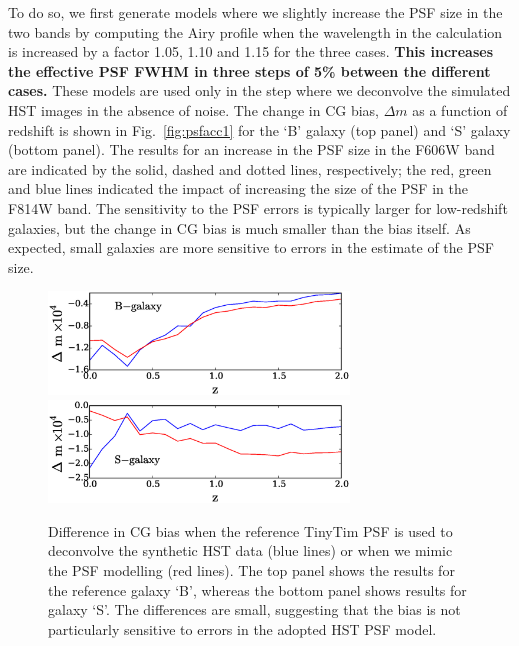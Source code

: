 \documentclass[useAMS,usenatbib]{mnras}
\begin{document}
To do so, we first generate models where we slightly increase the PSF size in the two bands by computing the  Airy profile when the wavelength in the calculation is increased by a factor 1.05, 1.10 and 1.15 for the three cases. {\bf This increases the effective PSF FWHM in three steps of 5\% between the different cases.} These models are used only in the step where we deconvolve the simulated HST images in the absence of noise. The change in CG bias, $\Delta m$ as a function of redshift is shown in Fig.~\ref{fig:psfacc1} for the `B' galaxy (top panel) and `S' galaxy (bottom panel).  The results for an increase in the PSF size in  the F606W band are indicated by the solid, dashed and dotted lines, respectively; the red, green and blue lines indicated the impact of increasing the size of the PSF in the F814W band. The sensitivity to the PSF errors is typically larger for low-redshift galaxies, but the change in CG bias is much smaller than the bias itself.  As expected, small galaxies are more sensitive to errors in the estimate of the PSF size.

\begin{figure}
\includegraphics[width=8.0cm]{ztinytim_b.eps}
\includegraphics[width=8.0cm]{ztinytim_s.eps}
\caption{Difference in CG bias when the reference {\sc TinyTim} PSF is used to deconvolve
the synthetic HST data (blue lines) or when we mimic the PSF modelling (red lines). The top
panel shows the results for the reference galaxy `B', whereas the bottom panel shows results
for galaxy `S'. The differences are small, suggesting that the bias is not particularly sensitive to
errors in the adopted HST PSF model.}
\label{fig:psfacc2}
\end{figure}
\end{document}
